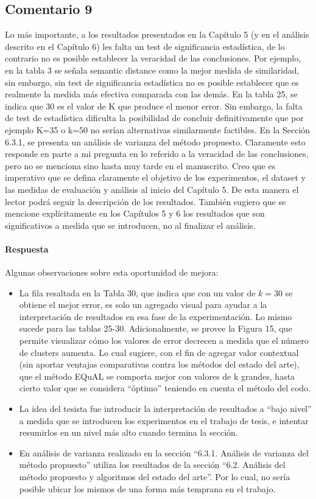 \subsection*{Comentario 9}
Lo más importante, a los resultados presentados en la Capítulo 5 (y en el análisis descrito en el Capítulo 6) les falta un test de significancia estadística, de lo contrario no es posible establecer la veracidad de las conclusiones. Por ejemplo, en la tabla 3 se señala semantic distance como la mejor medida de similaridad, sin embargo, sin test de significancia estadística no es posible establecer que es realmente la medida más efectiva comparada con las demás. En la tabla 25, se indica que 30 es el valor de K que produce el menor error. Sin embargo, la falta de test de estadística dificulta la posibilidad de concluir definitivamente que por ejemplo K=35 o k=50 no serían alternativas similarmente factibles. En la Sección 6.3.1, se presenta un análisis de varianza del método propuesto. Claramente esto responde en parte a mi pregunta en lo referido a la veracidad de las conclusiones, pero no se menciona sino hasta muy tarde en el manuscrito. Creo que es imperativo que se defina claramente el objetivo de los experimentos, el dataset y las medidas de evaluación y análisis al inicio del Capítulo 5. De esta manera el lector podrá seguir la descripción de los resultados. También sugiero que se mencione explícitamente en los Capítulos 5 y 6 los resultados que son significativos a medida que se introducen, no al finalizar el análisis.

\paragraph*{Respuesta}
Algunas observaciones sobre esta oportunidad de mejora:
\begin{itemize}
	\item La fila resaltada en la Tabla 30, que indica que con un valor de \(k=30\) se obtiene el mejor error, es solo un agregado visual para ayudar a la interpretación de resultados en esa fase de la experimentación. Lo mismo sucede para las tablas 25-30. Adicionalmente, se provee la Figura 15, que permite visualizar cómo los valores de error decrecen a medida que el número de clusters aumenta. Lo cual sugiere, con el fin de agregar valor contextual (sin aportar ventajas comparativas contra los métodos del estado del arte), que el método EQuAL se comporta mejor con valores de k grandes, hasta cierto valor que se considera ``óptimo'' teniendo en cuenta el método del codo.
	\item La idea del tesista fue introducir la interpretación de resultados a ``bajo nivel'' a medida que se introducen los experimentos en el trabajo de tesis, e intentar resumirlos en un nivel más alto cuando termina la sección.
	\item En análisis de varianza realizado en la sección ``6.3.1. Análisis de varianza del método propuesto'' utiliza los resultados de la sección ``6.2. Análisis del método propuesto y algoritmos del estado del arte''. Por lo cual, no sería posible ubicar los mismos de una forma más temprana en el trabajo.
\end{itemize}

